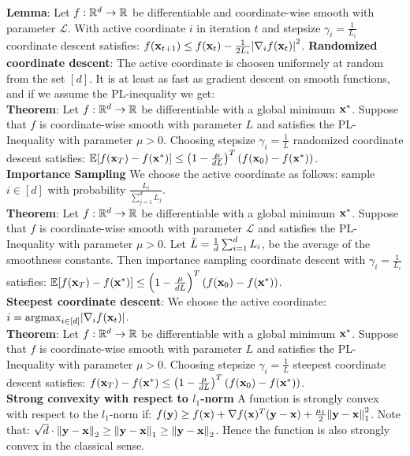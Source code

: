 \textbf{Lemma}: Let $f:\mathbb{R}^d \rightarrow \mathbb{R}$ be differentiable and coordinate-wise smooth with parameter $\mathcal{L}$. With active coordinate $i$ in iteration $t$ and stepsize $\gamma_i = \frac{1}{L_i}$ coordinate descent satisfies: $f(\mathbf{x}_{t+1}) \leq f(\mathbf{x}_t) - \frac{1}{2L_i} \abs{\nabla_i f(\mathbf{x}_t)}^2$.
\textbf{Randomized coordinate descent}: The active coordinate is choosen uniformely at random from the set $[d]$. It is at least as fast as gradient descent on smooth functions, and if we assume the PL-inequality we get: \\
\textbf{Theorem}: Let $f: \mathbb{R}^d \rightarrow \mathbb{R}$ be differentiable with a global minimum $\mathbf{x}^*$. Suppose that $f$ is coordinate-wise smooth with parameter $L$ and satisfies the PL-Inequality with parameter $\mu > 0$. Choosing stepsize $\gamma_i = \frac{1}{L}$ randomized coordinate descent satisfies: $\mathbb{E}[f(\mathbf{x}_T) - f(\mathbf{x}^*)] \leq \left(1 - \frac{\mu}{dL} \right)^T(f(\mathbf{x}_0) - f(\mathbf{x}^*))$. \\
\textbf{Importance Sampling} We choose the active coordinate as follows: sample $i \in [d]$ with probability $\frac{L_i}{\sum_{j=1}^d{L_j}}$. \\
\textbf{Theorem}: Let $f: \mathbb{R}^d \rightarrow \mathbb{R}$ be differentiable with a global minimum $\mathbf{x}^*$. Suppose that $f$ is coordinate-wise smooth with parameter $\mathcal{L}$ and satisfies the PL-Inequality with parameter $\mu > 0$. Let $\Bar{L} = \frac{1}{d}\sum_{i=1}^d{L_i}$, be the average of the smoothness constants. Then importance sampling coordinate descent with $\gamma_i = \frac{1}{L_i}$ satisfies: $\mathbb{E}[f(\mathbf{x}_T) - f(\mathbf{x}^*)] \leq \left(1 - \frac{\mu}{d\Bar{L}}\right)^T(f(\mathbf{x}_0) - f(\mathbf{x}^*))$. \\
\textbf{Steepest coordinate descent}: We choose the active coordinate: $i= \mathrm{argmax}_{i\in [d]}{\abs{\nabla_i f(\mathbf{x}_t)}}$. \\
\textbf{Theorem}: Let $f: \mathbb{R}^d \rightarrow \mathbb{R}$ be differentiable with a global minimum $\mathbf{x}^*$. Suppose that $f$ is coordinate-wise smooth with parameter $L$ and satisfies the PL-Inequality with parameter $\mu > 0$. Choosing stepsize $\gamma_i = \frac{1}{L}$ steepest coordinate descent satisfies: $f(\mathbf{x}_T) - f(\mathbf{x}^*) \leq \left(1 - \frac{\mu}{dL} \right)^T(f(\mathbf{x}_0) - f(\mathbf{x}^*))$. \\
\textbf{Strong convexity with respect to $l_1$-norm} A function is strongly convex with respect to the $l_1$-norm if: $f(\mathbf{y}) \geq f(\mathbf{x}) + \nabla f(\mathbf{x})^T (\mathbf{y} - \mathbf{x}) + \frac{\mu_1}{2}\norm{\mathbf{y} - \mathbf{x}}_1^2$. Note that: $\sqrt{d} \cdot \norm{\mathbf{y} - \mathbf{x}}_2  \geq \norm{\mathbf{y} - \mathbf{x}}_1 \geq \norm{\mathbf{y} - \mathbf{x}}_2$. Hence the function is also strongly convex in the classical sense.\\
